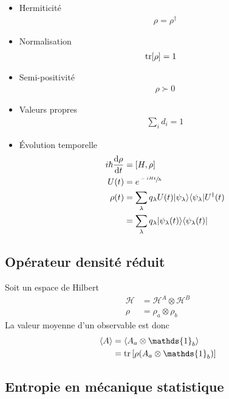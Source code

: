 \begin{itemize}
    \item Hermiticité
        \begin{align}
            \rho=\rho^\dagger
        \end{align}
    \item Normalisation
        \begin{align}
            \trace[\rho]&=1
        \end{align}
    \item Semi-positivité
        \begin{align}
            \rho\succ0
        \end{align}
    \item Valeurs propres
        \begin{align}
            \sum_i d_i=1
        \end{align}
    \item Évolution temporelle
        \begin{align}
            i\hbar\dv{\rho}{t}&=\qty[H,\rho]\\
        U(t)&=e^{\sfrac{-iHt}{\hbar}}\\
        \rho(t)&=\sum_\lambda q_\lambda
        U(t)|{\psi_\lambda}\rangle\langle{\psi_\lambda}|U^\dagger(t)\\
               &=\sum_\lambda q_\lambda|{\psi_\lambda(t)}\rangle\langle{\psi_\lambda(t)}|
        \end{align}
\end{itemize}

\subsection{Opérateur densité réduit} %
\label{sub:Opérateur densité réduit}

Soit un espace de Hilbert
\begin{align}
    \mathcal{H}&=\mathcal{H}^A\otimes\mathcal{H}^B\\
    \rho&=\rho_a\otimes\rho_b
\end{align}
La valeur moyenne d'un observable est donc
\begin{align}
    \expval{A}&=\expval{A_a\otimes\mathds{1}_b}\\
              &=\trace\qty[\rho\qty(A_a\otimes\mathds{1}_b)]
\end{align}


\subsection{Entropie en mécanique statistique} %
\label{sub:Entropie en mécanique statistique}

